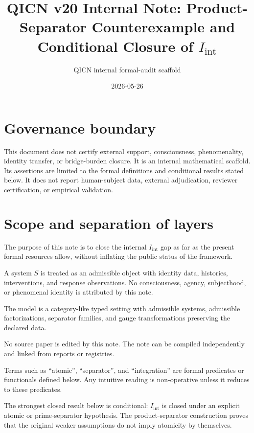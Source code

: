 \documentclass[11pt]{article}
\title{QICN v20 Internal Note: Product-Separator Counterexample and Conditional Closure of \texorpdfstring{$I_{\mathrm{int}}$}{I_int}}
\author{QICN internal formal-audit scaffold}
\date{2026-05-26}
\newcommand{\Iint}{I_{\mathrm{int}}}
\begin{document}
\maketitle

\section*{Governance boundary}
This document does not certify external support, consciousness, phenomenality, identity transfer, or bridge-burden closure. It is an internal mathematical scaffold. Its assertions are limited to the formal definitions and conditional results stated below. It does not report human-subject data, external adjudication, reviewer certification, or empirical validation.

\section{Scope and separation of layers}
The purpose of this note is to close the internal $\Iint$ gap as far as the present formal resources allow, without inflating the public status of the framework.

\begin{description}[leftmargin=2.6cm]
  \item[Ontology.] A system $S$ is treated as an admissible object with identity data, histories, interventions, and response observations. No consciousness, agency, subjecthood, or phenomenal identity is attributed by this note.
  \item[Mathematical model.] The model is a category-like typed setting with admissible systems, admissible factorizations, separator families, and gauge transformations preserving the declared data.
  \item[Implementation.] No source paper is edited by this note. The note can be compiled independently and linked from reports or registries.
  \item[Language.] Terms such as ``atomic'', ``separator'', and ``integration'' are formal predicates or functionals defined below. Any intuitive reading is non-operative unless it reduces to these predicates.
  \item[Interpretation.] The strongest closed result below is conditional: $\Iint$ is closed under an explicit atomic or prime-separator hypothesis. The product-separator construction proves that the original weaker assumptions do not imply atomicity by themselves.
\end{description}
\end{document}
